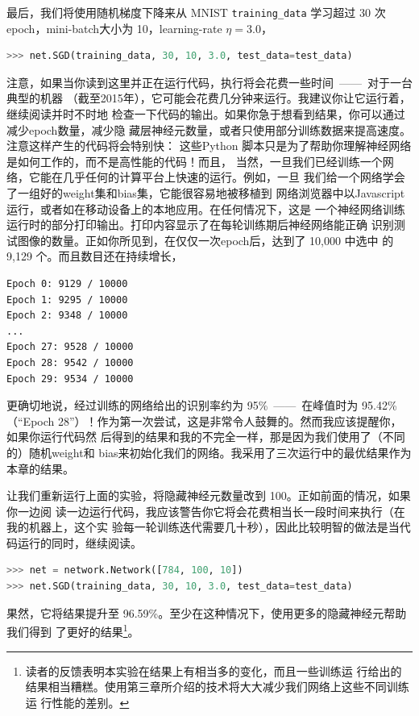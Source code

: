 最后，我们将使用随机梯度下降来从 MNIST \lstinline!training_data! 学习超过 30 次%
\gls*{epoch}，\gls*{mini-batch}大小为 10，\gls*{learning-rate} $\eta = 3.0$，

\begin{lstlisting}[language=Python]
>>> net.SGD(training_data, 30, 10, 3.0, test_data=test_data)
\end{lstlisting}

注意，如果当你读到这里并正在运行代码，执行将会花费一些时间~——~对于一台典型的机器
（截至2015年），它可能会花费几分钟来运行。我建议你让它运行着，继续阅读并时不时地
检查一下代码的输出。如果你急于想看到结果，你可以通过减少\gls*{epoch}数量，减少隐
藏层神经元数量，或者只使用部分训练数据来提高速度。注意这样产生的代码将会特别快：
这些Python 脚本只是为了帮助你理解神经网络是如何工作的，而不是高性能的代码！而且，
当然，一旦我们已经训练一个网络，它能在几乎任何的计算平台上快速的运行。例如，一旦
我们给一个网络学会了一组好的\gls*{weight}集和\gls*{bias}集，它能很容易地被移植到
网络浏览器中以Javascript 运行，或者如在移动设备上的本地应用。在任何情况下，这是
一个神经网络训练运行时的部分打印输出。打印内容显示了在每轮训练期后神经网络能正确
识别测试图像的数量。正如你所见到，在仅仅一次\gls*{epoch}后，达到了 10,000 中选中
的 9,129 个。而且数目还在持续增长，

\begin{lstlisting}[language=sh]
Epoch 0: 9129 / 10000
Epoch 1: 9295 / 10000
Epoch 2: 9348 / 10000
...
Epoch 27: 9528 / 10000
Epoch 28: 9542 / 10000
Epoch 29: 9534 / 10000
\end{lstlisting}

更确切地说，经过训练的网络给出的识别率约为 95\%~——~在峰值时为 95.42\%（“Epoch
  28”）！作为第一次尝试，这是非常令人鼓舞的。然而我应该提醒你，如果你运行代码然
后得到的结果和我的不完全一样，那是因为我们使用了（不同的）随机\gls*{weight}和
\gls*{bias}来初始化我们的网络。我采用了三次运行中的最优结果作为本章的结果。

让我们重新运行上面的实验，将隐藏神经元数量改到 100。正如前面的情况，如果你一边阅
读一边运行代码，我应该警告你它将会花费相当长一段时间来执行（在我的机器上，这个实
  验每一轮训练迭代需要几十秒），因此比较明智的做法是当代码运行的同时，继续阅读。

\begin{lstlisting}[language=Python]
>>> net = network.Network([784, 100, 10])
>>> net.SGD(training_data, 30, 10, 3.0, test_data=test_data)
\end{lstlisting}

果然，它将结果提升至 96.59\%。至少在这种情况下，使用更多的隐藏神经元帮助我们得到
了更好的结果\footnote{读者的反馈表明本实验在结果上有相当多的变化，而且一些训练运
  行给出的结果相当糟糕。使用第三章所介绍的技术将大大减少我们网络上这些不同训练运
  行性能的差别。}。

